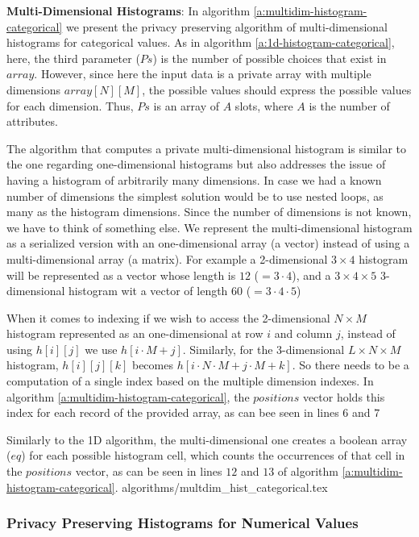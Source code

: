 \textbf{Multi-Dimensional Histograms}: In algorithm \ref{a:multidim-histogram-categorical} we present the privacy preserving algorithm of multi-dimensional histograms for categorical values.
As in algorithm \ref{a:1d-histogram-categorical}, here, the third parameter ($Ps$) is the number of possible choices that exist in $array$.
However, since here the input data is a private array with multiple dimensions $array[N][M]$, the possible values should express the possible values for each dimension.
Thus, $Ps$ is an array of $A$ slots, where $A$ is the number of attributes.


The algorithm that computes a private multi-dimensional histogram is similar to the one regarding one-dimensional histograms but also addresses the issue of having a histogram of arbitrarily many dimensions.
In case we had a known number of dimensions the simplest solution would be to use nested loops, as many as the histogram dimensions.
Since the number of dimensions is not known, we have to think of something else.
We represent the multi-dimensional histogram as a serialized version with an one-dimensional array (a vector) instead of using a multi-dimensional array (a matrix).
For example a 2-dimensional $3 \times 4$ histogram will be represented as a vector whose length is $ 12 $ ($= 3 \cdot 4$), and a $3 \times 4 \times 5$ 3-dimensional histogram wit a vector of length $ 60 $ ($= 3 \cdot 4 \cdot 5$)

When it comes to indexing if we wish to access the 2-dimensional $N \times M$ histogram represented as an one-dimensional at row $ i $ and column $ j $, instead of using $h[i][j]$ we use $h[i \cdot M + j]$.
Similarly, for the 3-dimensional $L \times N \times M$ histogram, $h[i][j][k]$ becomes $h[i \cdot N \cdot M + j \cdot M + k]$. So there needs to be a computation of a single index based on the multiple dimension indexes. In algorithm \ref{a:multidim-histogram-categorical}, the $positions$ vector holds this index for each record of the provided array, as can bee seen in lines $ 6 $ and $ 7 $

Similarly to the 1D algorithm, the multi-dimensional one creates a boolean array ($eq$) for each possible histogram cell, which counts the occurrences of that cell in the $positions$ vector, as can be seen in lines $12$ and $13$ of algorithm \ref{a:multidim-histogram-categorical}.
{algorithms/multdim_hist_categorical.tex}



\subsubsection{Privacy Preserving Histograms for Numerical Values}\label{sss:histogram-numerical}

